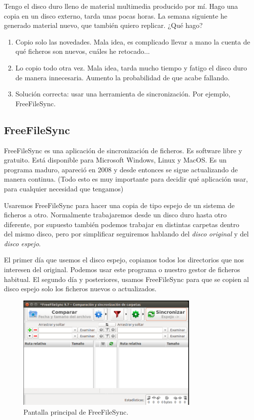 \documentclass[a4paper,12pt]{article}
\begin{document}
Tengo el disco duro lleno de material multimedia producido por mí. Hago una copia en un disco externo, tarda unas
pocas horas. La semana siguiente he generado material nuevo, que también quiero replicar. ¿Qué hago?

    \begin{enumerate}
    \item
Copio solo las novedades. Mala idea, es complicado llevar a mano la cuenta de qué ficheros son nuevos,
cuáles he retocado...

    \item
Lo copio todo otra vez. Mala idea, tarda mucho tiempo y fatigo el disco duro de manera innecesaria. Aumento la probabilidad
de que acabe fallando.

    \item
Solución correcta: usar una herramienta de sincronización. Por ejemplo, FreeFileSync. 

    \end{enumerate}



\subsection{FreeFileSync}
FreeFileSync es una aplicación de sincronización de ficheros. Es software libre y gratuito. Está disponible para Microsoft Windows, Linux y MacOS. 
Es un programa maduro, apareció en 2008 y desde entonces se sigue actualizando de manera continua. (Todo esto es muy importante para
decidir qué aplicación usar, para cualquier necesidad que tengamos)

Usaremos FreeFileSync para hacer una copia de tipo espejo de un sistema de ficheros a otro. Normalmente trabajaremos
desde un disco duro hasta otro diferente, por supuesto también podemos trabajar en distintas carpetas dentro
del mismo disco, pero por simplificar seguiremos hablando del \emph{disco original} y del \emph{disco espejo}.

El primer día que usemos el disco espejo, copiamos todos los directorios que nos interesen del original. Podemos usar
este programa o nuestro gestor de ficheros habitual. El segundo día y posteriores, usamos FreeFileSync para
que se copien al disco espejo solo los ficheros nuevos o actualizados.

\begin{figure}[htpb]
  \centering
    \includegraphics[width=0.8\textwidth]{images/ffs01}
  \caption{Pantalla principal de FreeFileSync.}
  \label{fig:ffs_main}
\end{figure}
\end{document}
